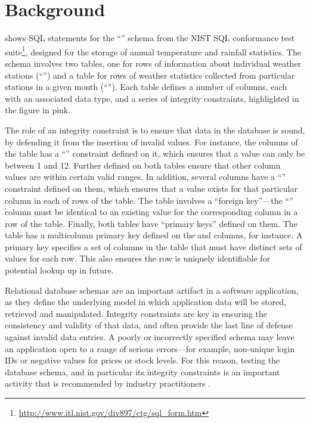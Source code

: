 
\section{Background}
\label{sec:background}



 shows SQL  statements for the ``\NistWeather'' schema from the NIST SQL conformance test suite\footnote{\url{http://www.itl.nist.gov/div897/ctg/sql_form.htm}}, designed for the storage of annual temperature and rainfall statistics. The schema involves two tables, one for rows of information about individual weather stations (``'') and a table for rows of weather statistics collected from particular stations in a given month (``''). Each table defines a number of columns, each with an associated data type, and a series of integrity constraints, highlighted in the figure in pink. 

The role of an integrity constraint is to ensure that data in the database is sound, by defending it from the insertion of invalid values. For instance, the  columns of the  table has a ``\CHECK'' constraint defined on it, which ensures that a  value can only be between 1 and 12. Further \CCs defined on both tables ensure that other column values are within certain valid ranges. In addition, several columns have a ``\NOTNULL'' constraint defined on them, which ensures that a value exists for that particular column in each of rows of the table. The  table involves a ``foreign key''---the ``'' column must be identical to an existing value for the corresponding  column in a row of the  table. Finally, both tables have ``primary keys'' defined on them. The  table has a multicolumn primary key defined on the  and  columns, for instance. A primary key specifies a set of columns in the table that must have distinct sets of values for each row. This also ensures the row is uniquely identifiable for potential lookup up in future. 

Relational database schemas are an important artifact in a software application, as they define the underlying model in which application data will be stored, retrieved and manipulated. Integrity constraints are key in ensuring the consistency and validity of that data, and often provide the last line of defense against invalid data entries. A poorly or incorrectly specified schema may leave an application open to a range of serious errors---for example, non-unique login IDs or negative values for prices or stock levels. For this reason, testing the database schema, and in particular its integrity constraints is an important activity that is recommended by industry practitioners \cite{DzoneDatabaseTesting}.

